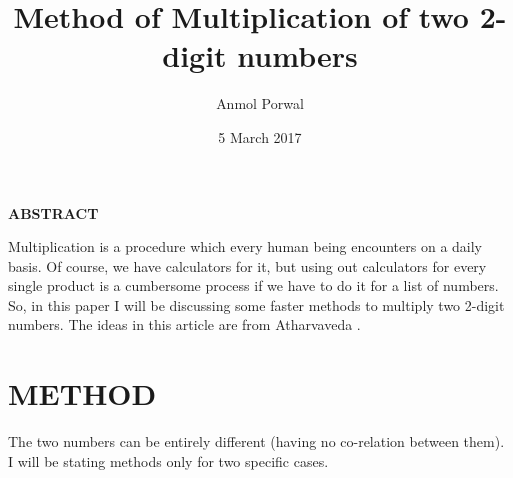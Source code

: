 \documentclass[a4paper,10pt]{article}
\title{Method of Multiplication of two 2- digit numbers}
\author{Anmol Porwal}
\date{5 March 2017 }
\begin{document}
\maketitle
 \begin{center}
\textbf{ABSTRACT}
 \end{center}
Multiplication is a procedure which every human being encounters on a daily basis. Of course, we have calculators for it, but using out calculators for every single product is a cumbersome process if we have to do it for a list of numbers. So, in this paper I will be discussing some faster methods to multiply two 2-digit numbers. The ideas in this article are from Atharvaveda \cite{Atharvaveda}. 
\section{\textbf{METHOD}}
The two numbers can be entirely different (having no co-relation between them). I will be stating methods only for two specific cases.
\end{document}

